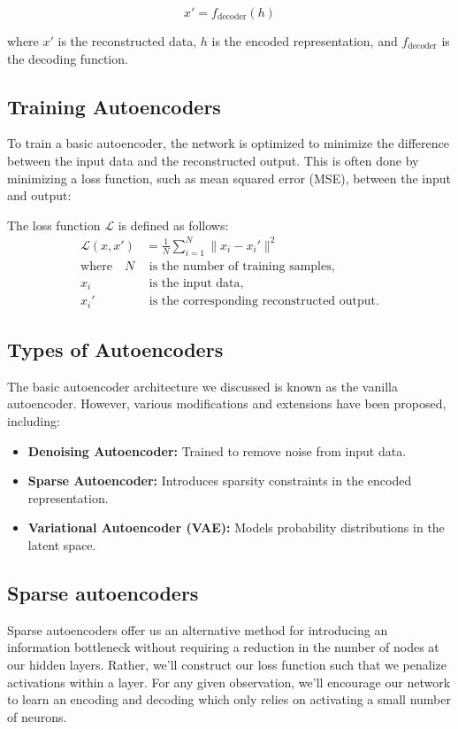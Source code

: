 \documentclass{article}
\begin{document}
			\[ x' = f_{\text{decoder}}(h) \]

			where \(x'\) is the reconstructed data, \(h\) is the encoded representation, and \(f_{\text{decoder}}\) is the decoding function.


	\subsection{Training Autoencoders}

		To train a basic autoencoder, the network is optimized to minimize the difference between the input data and the reconstructed output. This is often done by minimizing a loss function, such as mean squared error (MSE), between the input and output:

		The loss function \(\mathcal{L}\) is defined as follows:
		\begin{align}
			\mathcal{L}(x, x') &= \frac{1}{N} \sum_{i=1}^{N} \|x_i - x_i'\|^2 \\
			\text{where} \quad N &\text{ is the number of training samples,} \nonumber \\
			x_i &\text{ is the input data,} \nonumber \\
			x_i' &\text{ is the corresponding reconstructed output.} \nonumber
		\end{align}


	\subsection{Types of Autoencoders}

		The basic autoencoder architecture we discussed is known as the vanilla autoencoder. However, various modifications and extensions have been proposed, including:
		\begin{itemize}
			\item \textbf{Denoising Autoencoder:} Trained to remove noise from input data.
			\item \textbf{Sparse Autoencoder:} Introduces sparsity constraints in the encoded representation.
			\item \textbf{Variational Autoencoder (VAE):} Models probability distributions in the latent space.
		\end{itemize}


	\subsection{Sparse autoencoders}
		Sparse autoencoders offer us an alternative method for introducing an information bottleneck without requiring a reduction in the number of nodes at our hidden layers. Rather, we'll construct our loss function such that we penalize activations within a layer. For any given observation, we'll encourage our network to learn an encoding and decoding which only relies on activating a small number of neurons.
\end{document}
